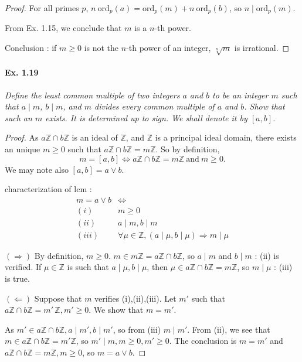 \documentclass[11pt,a4paper]{article}
\newcommand{\Z}{\mathbb{Z}}
\begin{document}
{\begin{proof}
For all primes $p$, $n\  \mathrm{ord}_p(a) = \mathrm{ord}_p(m)  + n\  \mathrm{ord}_p(b)$, so $n \mid \mathrm{ord}_p(m) $.

From Ex. 1.15, we conclude that $m$ is a $n$-th power.

Conclusion : if $m \geq 0$ is not the $n$-th power of an integer, $\sqrt[n]{m}$ is irrational.  
\end{proof}

\paragraph{Ex. 1.19}

{\it Define the least common multiple of two integers $a$ and $b$ to be an integer $m$ such that $a \mid m$, $b \mid m$, and $m$ divides every common multiple of $a$ and $b$. Show that such an $m$ exists. It is determined up to sign. We shall denote it by $[a, b]$.
}

\begin{proof}
  As $a\Z \cap b \Z$ is an ideal of $\Z$, and $\Z$ is a principal ideal domain, there exists an unique $m\geq 0$ such that $a\Z \cap b\Z = m \Z$. So by definition,
  $$m = [a,b] \iff a\Z \cap b \Z = m \Z \ \mathrm{and}\ m \geq 0.$$
  We may note also $[a,b] = a \vee b$.
  
  characterization of lcm :
  \begin{align*}
  m = a \vee b &\iff\\
  (i)\ & m \geq 0\\
  (ii)\  &a \mid m, b \mid m\\
  (iii)\  &\forall \mu \in \Z, (a \mid \mu, b \mid \mu) \Rightarrow m \mid \mu
  \end{align*}
  
  $(\Rightarrow)$ By definition, $m\geq 0$. $m \in m\Z = a\Z \cap b \Z$, so $a \mid m$ and $b \mid m$ : (ii) is verified.
  If $\mu \in \Z$ is such that $a\mid \mu, b \mid \mu$, then $\mu \in a \Z \cap b \Z = m \Z$, so $m \mid \mu$ : (iii) is true.
  
  $(\Leftarrow)$ Suppose that $m$ verifies  (i),(ii),(iii). Let $m'$ such that $a\Z \cap b \Z = m' \,\Z, m'\geq 0$. We show that $m=m'$.
  
  As $m' \in a \Z \cap b \Z, a \mid m', b \mid m'$, so from (iii) $m \mid m'$. From (ii), we see that $m \in a \Z \cap b\Z = m' \Z$, so $m' \mid m, m\geq 0, m' \geq 0$. The conclusion is $m=m'$ and $a\Z \cap b \Z = m \Z, m\geq 0$, so $m = a \vee b$.
\end{proof}

}
\end{document}
